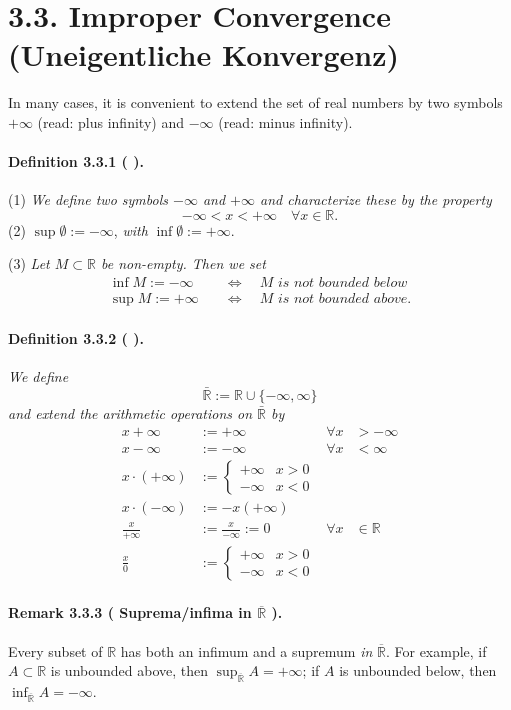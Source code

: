 \documentclass[12pt]{article}
\newcommand{\R}{\mathbb{R}}
\newcommand{\NumberedDefinition}[3]{%
\paragraph*{Definition #1 ( #2 ).} #3\par}
\newcommand{\NumberedRemark}[3]{%
\paragraph*{Remark #1 ( #2 ).} #3\par}
\begin{document}
\section*{3.3. Improper Convergence (Uneigentliche Konvergenz)}

In many cases, it is convenient to extend the set of real numbers by two symbols $+\infty$ (read: plus infinity) and $-\infty$ (read: minus infinity).

\NumberedDefinition{3.3.1}{}{
(1) \textit{We define two symbols $-\infty$ and $+\infty$ and characterize these by the property}
\[
-\infty < x < +\infty \quad \forall x \in \R.
\]
(2) $\sup \emptyset := -\infty$, \textit{with} $\inf \emptyset := +\infty$.

(3) \textit{Let $M \subset \R$ be non-empty. Then we set}
\begin{align*}
\inf M := -\infty \quad &\Leftrightarrow \quad M \textit{ is not bounded below} \\
\sup M := +\infty \quad &\Leftrightarrow \quad M \textit{ is not bounded above.}
\end{align*}
}

\NumberedDefinition{3.3.2}{}{
\textit{We define}
\[
\bar{\R} := \R \cup \{-\infty, \infty\}
\]
\textit{and extend the arithmetic operations on $\bar{\R}$ by}
\begin{align*}
x + \infty &:= +\infty & \forall x &> -\infty \\
x - \infty &:= -\infty & \forall x &< \infty \\
x \cdot (+\infty) &:= \begin{cases} +\infty & x > 0 \\ -\infty & x < 0 \end{cases} \\
x \cdot (-\infty) &:= -x(+\infty) \\
\frac{x}{+\infty} &:= \frac{x}{-\infty} := 0 & \forall x &\in \R \\
\frac{x}{0} &:= \begin{cases} +\infty & x > 0 \\ -\infty & x < 0 \end{cases}
\end{align*}
}

\NumberedRemark{3.3.3}{Suprema/infima in $\overline{\R}$}{Every subset of $\R$ has both an infimum and a supremum \emph{in} $\overline{\R}$. For example, if $A\subset\R$ is unbounded above, then $\sup_{\overline{\R}} A=+\infty$; if $A$ is unbounded below, then $\inf_{\overline{\R}} A=-\infty$.}
\end{document}
